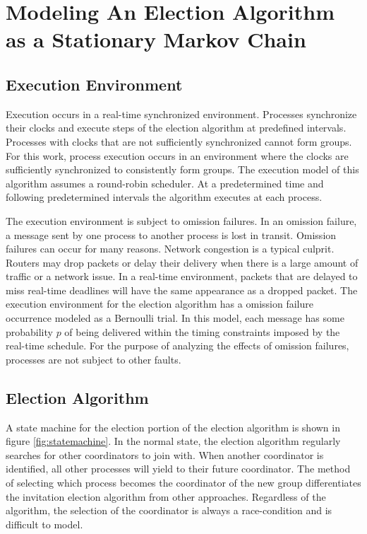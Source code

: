 \section{Modeling An Election Algorithm as a Stationary Markov Chain}



\subsection{Execution Environment}

Execution occurs in a real-time synchronized environment.
Processes synchronize their clocks and execute steps of the election algorithm at predefined intervals.
Processes with clocks that are not sufficiently synchronized cannot form groups.
For this work, process execution occurs in an environment where the clocks are sufficiently synchronized to consistently form groups.
The execution model of this algorithm assumes a round-robin scheduler.
At a predetermined time and following predetermined intervals the algorithm executes at each process.

The execution environment is subject to omission failures.
In an omission failure, a message sent by one process to another process is lost in transit.
Omission failures can occur for many reasons.
Network congestion is a typical culprit.
Routers may drop packets or delay their delivery when there is a large amount of traffic or a network issue.
In a real-time environment, packets that are delayed to miss real-time deadlines will have the same appearance as a dropped packet.
The execution environment for the election algorithm has a omission failure occurrence modeled as a Bernoulli trial.
In this model, each message has some probability $p$ of being delivered within the timing constraints imposed by the real-time schedule.
For the purpose of analyzing the effects of omission failures, processes are not subject to other faults.

\subsection{Election Algorithm}

A state machine for the election portion of the election algorithm is shown in figure \ref{fig:statemachine}.
In the normal state, the election algorithm regularly searches for other coordinators to join with.
When another coordinator is identified, all other processes will yield to their future coordinator.
The method of selecting which process becomes the coordinator of the new group differentiates the invitation election algorithm from other approaches.
Regardless of the algorithm, the selection of the coordinator is always a race-condition and is difficult to model.

